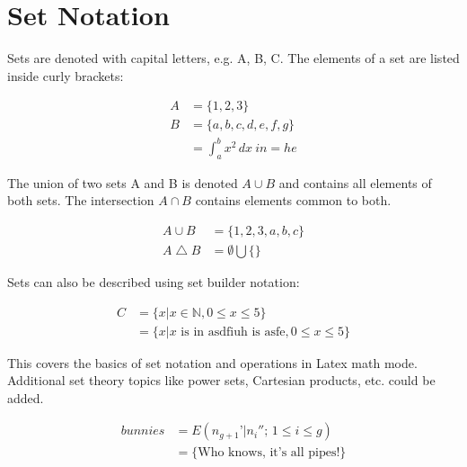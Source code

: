 \documentclass{article}
\begin{document}
\section{Set Notation}

Sets are denoted with capital letters, e.g. A, B, C. The elements of a set are listed inside curly brackets:

\begin{align}
A &= \{1, 2, 3\} \\
B &= \{a, b, c, d, e, f, g\} \\
&= \int_{a}^{b} x^2 \,dx\ in = he
\end{align}

The union of two sets A and B is denoted $A \cup B$ and contains all elements of both sets. The intersection $A \cap B$ contains elements common to both.

\begin{align}
A \cup B & = \{1, 2, 3, a, b, c\} \\
A \bigtriangleup B & = \emptyset \bigcup \{\}
\end{align}

Sets can also be described using set builder notation:

\begin{align}
C & = \{x | x \in \mathbb{N}, 0 \leq x \leq 5\} \\
& = \{x |\textrm{$x$ is in asdfiuh is asfe}, 0 \leq x \leq 5\}
\end{align}

This covers the basics of set notation and operations in Latex math mode. Additional set theory topics like power sets, Cartesian products, etc. could be added.

\begin{align}
bunnies & = E(n_{g+1}’|n_i'';\,1\le i\le g) \\
& = \{\textrm{Who knows, it's all pipes!}\}
\end{align}
\end{document}
